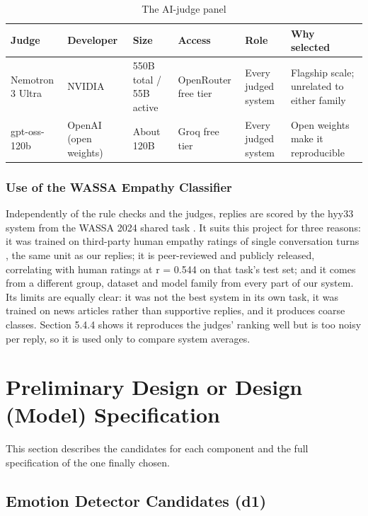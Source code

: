 \begin{table}[H]
\centering
\scriptsize
\begin{tabularx}{\textwidth}{@{}lXXXXX@{}}
\toprule
\textbf{Judge} & \textbf{Developer} & \textbf{Size} & \textbf{Access} & \textbf{Role} & \textbf{Why selected} \\
\midrule
Nemotron 3 Ultra & NVIDIA & 550B total / 55B active & OpenRouter free tier & Every judged system & Flagship scale; unrelated to either family \\
gpt-oss-120b & OpenAI (open weights) & About 120B & Groq free tier & Every judged system & Open weights make it reproducible \\
\bottomrule
\end{tabularx}
\caption{The AI-judge panel}
\label{tab:4.1}
\end{table}

\subsubsection{Use of the WASSA Empathy Classifier}

Independently of the rule checks and the judges, replies are scored by the hyy33 system from the WASSA 2024 shared task \cite{yang2024hyy33}. It suits this project for three reasons: it was trained on third-party human empathy ratings of single conversation turns \cite{giorgi2024wassa}, the same unit as our replies; it is peer-reviewed and publicly released, correlating with human ratings at r = 0.544 on that task's test set; and it comes from a different group, dataset and model family from every part of our system. Its limits are equally clear: it was not the best system in its own task, it was trained on news articles rather than supportive replies, and it produces coarse classes. Section 5.4.4 shows it reproduces the judges' ranking well but is too noisy per reply, so it is used only to compare system averages.

\section{Preliminary Design or Design (Model) Specification}
\label{sec:4.2}

This section describes the candidates for each component and the full specification of the one finally chosen.

\subsection{Emotion Detector Candidates (d1)}

